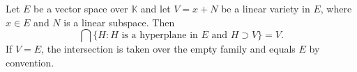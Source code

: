Let $E$ be a vector space over $\mathbb{K}$ and let $V = x + N$ be a linear variety in $E$, where $x \in E$ and $N$ is a linear subspace. Then
$$\bigcap\{H : H \text{ is a hyperplane in } E \text{ and } H \supset V\} = V.$$
If $V = E$, the intersection is taken over the empty family and equals $E$ by convention.
